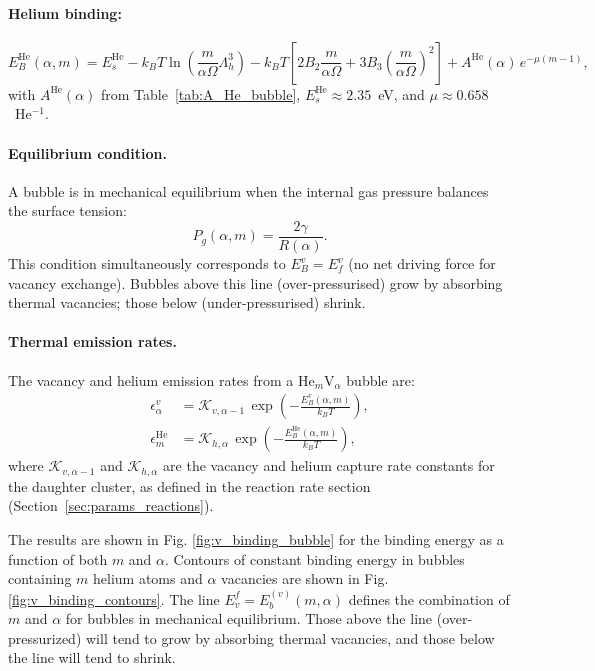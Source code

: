\documentclass[pdflatex,sn-basic]{sn-jnl} %
\begin{document}
\paragraph{Helium binding:}
\begin{equation}\label{eq:EbHe_summary}
    E_B^{\mathrm{He}}(\alpha,m) = E_s^{\mathrm{He}}
    - k_BT\ln\!\left(\frac{m}{\alpha\Omega}\Lambda_h^3\right)
    - k_BT\!\left[2B_2\frac{m}{\alpha\Omega}
    + 3B_3\!\left(\frac{m}{\alpha\Omega}\right)^{\!2}\right]
    + A^{\mathrm{He}}(\alpha)\,e^{-\mu(m-1)},
\end{equation}
with $A^{\mathrm{He}}(\alpha)$ from Table~\ref{tab:A_He_bubble},
$E_s^{\mathrm{He}} \approx 2.35$~eV, and $\mu \approx 0.658$~He$^{-1}$.

\paragraph{Equilibrium condition.}
A bubble is in mechanical equilibrium when the internal gas pressure balances
the surface tension:
\begin{equation}\label{eq:mech_equil}
    P_g(\alpha,m) = \frac{2\gamma}{R(\alpha)}.
\end{equation}
This condition simultaneously corresponds to $E_B^v = E_f^v$ (no net driving
force for vacancy exchange). Bubbles above this line (over-pressurised) grow by
absorbing thermal vacancies; those below (under-pressurised) shrink.

\paragraph{Thermal emission rates.}
The vacancy and helium emission rates from a He$_m$V$_\alpha$ bubble are:
\begin{align}
    \epsilon_\alpha^v &= \mathcal{K}_{v,\alpha-1}\,
        \exp\!\left(-\frac{E_B^v(\alpha,m)}{k_BT}\right), \label{eq:eps_v_bubble} \\
    \epsilon_m^{\mathrm{He}} &= \mathcal{K}_{h,\alpha}\,
        \exp\!\left(-\frac{E_B^{\mathrm{He}}(\alpha,m)}{k_BT}\right),
        \label{eq:eps_He_bubble}
\end{align}
where $\mathcal{K}_{v,\alpha-1}$ and $\mathcal{K}_{h,\alpha}$ are the
vacancy and helium capture rate constants for the daughter cluster, as
defined in the reaction rate section (Section~\ref{sec:params_reactions}).



The results are shown in Fig. \ref{fig:v_binding_bubble} for the binding energy as a function of both $m$ and $\alpha$. Contours of constant binding energy in bubbles containing $m$ helium atoms and $\alpha$ vacancies are shown in Fig. \ref{fig:v_binding_contours}. The line $E_v^f=E_b^{(v)}(m,\alpha)$ defines the combination of $m$ and $\alpha$ for bubbles in mechanical equilibrium. Those above the line (over-pressurized) will tend to grow by absorbing thermal vacancies, and those below the line will tend to shrink.
\end{document}
